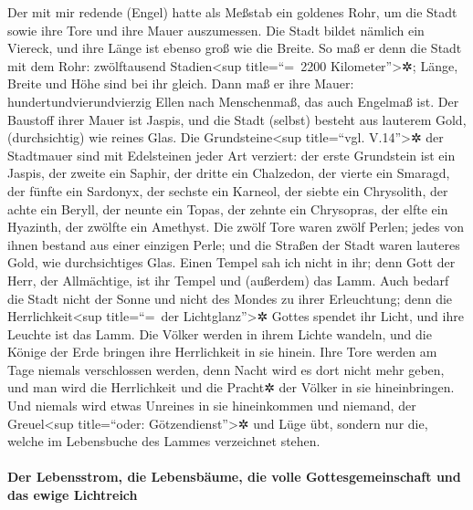  Der mit mir redende (Engel) hatte als Meßstab ein
goldenes Rohr, um die Stadt sowie ihre Tore und ihre Mauer auszumessen.
 Die Stadt bildet nämlich ein Viereck, und ihre Länge ist
ebenso groß wie die Breite. So maß er denn die Stadt mit dem Rohr:
zwölftausend Stadien\textless sup title=``=~2200
Kilometer''\textgreater✲; Länge, Breite und Höhe sind bei ihr gleich.
 Dann maß er ihre Mauer: hundertundvierundvierzig Ellen
nach Menschenmaß, das auch Engelmaß ist.  Der Baustoff
ihrer Mauer ist Jaspis, und die Stadt (selbst) besteht aus lauterem
Gold, (durchsichtig) wie reines Glas.  Die
Grundsteine\textless sup title=``vgl. V.14''\textgreater✲ der Stadtmauer
sind mit Edelsteinen jeder Art verziert: der erste Grundstein ist ein
Jaspis, der zweite ein Saphir, der dritte ein Chalzedon, der vierte ein
Smaragd,  der fünfte ein Sardonyx, der sechste ein
Karneol, der siebte ein Chrysolith, der achte ein Beryll, der neunte ein
Topas, der zehnte ein Chrysopras, der elfte ein Hyazinth, der zwölfte
ein Amethyst.  Die zwölf Tore waren zwölf Perlen; jedes
von ihnen bestand aus einer einzigen Perle; und die Straßen der Stadt
waren lauteres Gold, wie durchsichtiges Glas.  Einen
Tempel sah ich nicht in ihr; denn Gott der Herr, der Allmächtige, ist
ihr Tempel und (außerdem) das Lamm.  Auch bedarf die
Stadt nicht der Sonne und nicht des Mondes zu ihrer Erleuchtung; denn
die Herrlichkeit\textless sup title=``=~der Lichtglanz''\textgreater✲
Gottes spendet ihr Licht, und ihre Leuchte ist das Lamm. 
Die Völker werden in ihrem Lichte wandeln, und die Könige der Erde
bringen ihre Herrlichkeit in sie hinein.  Ihre Tore
werden am Tage niemals verschlossen werden, denn Nacht wird es dort
nicht mehr geben,  und man wird die Herrlichkeit und die
Pracht✲ der Völker in sie hineinbringen.  Und niemals
wird etwas Unreines in sie hineinkommen und niemand, der
Greuel\textless sup title=``oder: Götzendienst''\textgreater✲ und Lüge
übt, sondern nur die, welche im Lebensbuche des Lammes verzeichnet
stehen.

\hypertarget{der-lebensstrom-die-lebensbuxe4ume-die-volle-gottesgemeinschaft-und-das-ewige-lichtreich}{%
\paragraph{Der Lebensstrom, die Lebensbäume, die volle
Gottesgemeinschaft und das ewige
Lichtreich}\label{der-lebensstrom-die-lebensbuxe4ume-die-volle-gottesgemeinschaft-und-das-ewige-lichtreich}}

